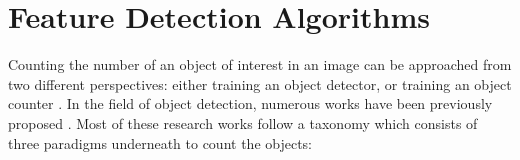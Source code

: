 
\section{Feature Detection Algorithms} 

Counting the number of an object of interest in an image can be approached from two different perspectives: either training an object detector, or training an object counter \cite{segui2015learning}. In the field of object detection, numerous works have been previously proposed \cite{paragios2001mrf, cho1999neural, regazzoni1996distributed, davies1995crowd, kong2005counting, marana1998efficacy, viola2004robust}. Most of these research works follow a taxonomy which consists of three paradigms underneath to count the objects:

